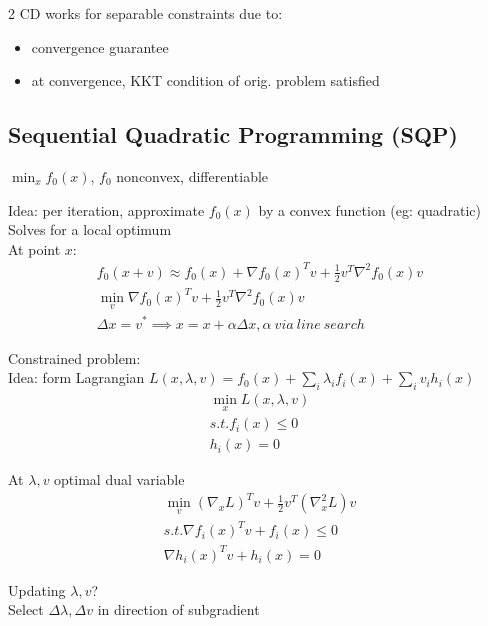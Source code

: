 \documentclass[8pt]{extarticle}
\begin{document}
\begin{multicols*}{2}
  CD works for separable constraints due to:
  \begin{itemize}
  \item convergence guarantee
  \item at convergence, KKT condition of orig. problem satisfied
  \end{itemize}

  \vfill\null
  \columnbreak
  
  \subsection{Sequential Quadratic Programming (SQP)}
  
  $\min_x f_0(x)$, $f_0$ nonconvex, differentiable

  Idea: per iteration, approximate $f_0(x)$ by a convex function (eg: quadratic)\\
  Solves for a local optimum\\

  At point $x$:
  \begin{align*}
    f_0(x+v) \approx f_0(x) + \nabla f_0(x)^T v + \frac{1}{2} v^T \nabla^2 f_0(x) v\\
    \min_v \nabla f_0(x)^T v + \frac{1}{2} v^T \nabla^2 f_0(x) v\\
    \Delta x = v^* \implies x = x + \alpha \Delta x, \alpha\ via\ line\ search
  \end{align*}

  Constrained problem:\\
  Idea: form Lagrangian $L(x,\lambda,v)=f_0(x)+\sum_i \lambda_i f_i(x) + \sum_i v_i h_i(x)$
  \begin{align*}
    \min_x L(x,\lambda,v)\\
    s.t. f_i(x) \leq 0\\
    h_i(x) = 0
  \end{align*}
  
  At $\lambda,v$ optimal dual variable
  \begin{align*}
    \min_v (\nabla_x L)^T v + \frac{1}{2}v^T(\nabla_x^2L)v\\
    s.t. \nabla f_i(x)^Tv + f_i(x) \leq 0\\
         \nabla h_i(x)^Tv + h_i(x) = 0
  \end{align*}

  Updating $\lambda,v$?\\
  Select $\Delta \lambda, \Delta v$ in direction of subgradient\\


\end{multicols*}
\end{document}
